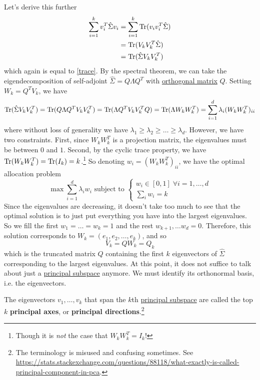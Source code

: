   Let's derive this further 
  \begin{align}
    \sum_{i = 1}^k v_i^T \hat{\Sigma} v_i 
    & = \sum_{i=1}^k \operatorname{Tr}(v_i v_i^T \hat{\Sigma}) \\ 
    & = \operatorname{Tr}(V_k V_k^T \hat{\Sigma}) \\ 
    & = \operatorname{Tr}(\hat{\Sigma} V_k V_k^T)
  \end{align}
  which again is equal to \ref{trace}. By the spectral theorem, we can take the eigendecomposition of self-adjoint $\hat{\Sigma} = Q \Lambda Q^T$ with \hyperref[lin-def:orthogonal-matrix]{orthogonal matrix} $Q$. Setting $W_k = Q^T V_k$, we have 
  \begin{equation}
    \operatorname{Tr}(\hat{\Sigma} V_k V_k^T) = \operatorname{Tr}(Q \Lambda Q^T V_k V_k^T) = \operatorname{Tr}(\Lambda Q^T V_k V_k^T Q) = \operatorname{Tr}(\Lambda W_k W_k^T) = \sum_{i = 1}^d \lambda_i (W_k W_k^T)_{ii}
  \end{equation}
  where without loss of generality we have $\lambda_1 \geq \lambda_2 \geq \ldots \geq \lambda_d$. However, we have two constraints. First, since $W_k W_k^T$ is a projection matrix, the eigenvalues must be between $0$ and $1$. Second, by the cyclic trace property, we have $\operatorname{Tr}(W_k W_k^T) = \operatorname{Tr}(I_k) = k$.\footnote{Though it is \textit{not} the case that $W_k W_k^T = I_k$!} So denoting $w_i = (W_k W_k^T)_{ii}$, we have the optimal allocation problem 
  \begin{equation}
    \max \sum_{i=1}^d \lambda_i w_i \text{ subject to } \begin{cases} 
      w_i \in [0, 1] \; \forall i = 1, \ldots, d \\
      \sum_i w_i = k
    \end{cases}
  \end{equation}
  Since the eigenvalues are decreasing, it doesn't take too much to see that the optimal solution is to just put everything you have into the largest eigenvalues. So we fill the first $w_1 = \ldots = w_k = 1$ and the rest $w_{k+1}, \ldots w_d = 0$. Therefore, this solution corresponds to $W_k = (e_1, e_2, \ldots, e_k)$, and so 
  \begin{equation}
    V_k = Q W_k = Q_k
  \end{equation}
  which is the truncated matrix $Q$ containing the first $k$ eigenvectors of $\hat{\Sigma}$ corresponding to the largest eigenvalues. At this point, it does not suffice to talk about just a \hyperref[def:principal-subspace]{principal subspace} anymore. We must identify its orthonormal basis, i.e. the eigenvectors. 

  \begin{definition}
    \label{def:principal-axis}
    The eigenvectors $v_1, \ldots, v_k$ that span the $k$th \hyperref[def:principal-subspace]{principal subspace} are called the top $k$ \textbf{principal axes}, or \textbf{principal directions}.\footnote{The terminology is misused and confusing sometimes. See \href{https://stats.stackexchange.com/questions/88118/what-exactly-is-called-principal-component-in-pca}{https://stats.stackexchange.com/questions/88118/what-exactly-is-called-principal-component-in-pca}.} 
  \end{definition} 
  
